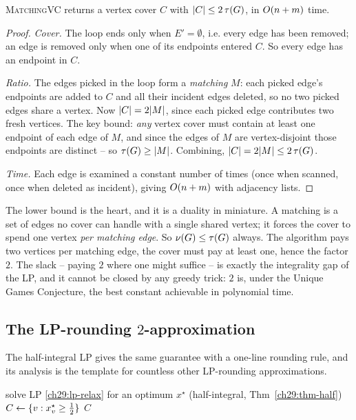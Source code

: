 \begin{lemma}
\label{ch29:lem-matchvc}
\textsc{MatchingVC} returns a vertex cover $C$ with $\lvert C\rvert\le 2\,\tau(G)$, in
$O(n+m)$ time.
\end{lemma}

\begin{proof}
\emph{Cover.} The loop ends only when $E'=\emptyset$, i.e. every edge has been
removed; an edge is removed only when one of its endpoints entered $C$. So every
edge has an endpoint in $C$.

\emph{Ratio.} The edges picked in the loop form a \emph{matching} $M$: each
picked edge's endpoints are added to $C$ and all their incident edges deleted, so
no two picked edges share a vertex. Now $\lvert C\rvert=2\lvert M\rvert$, since each picked edge
contributes two fresh vertices. The key bound: \emph{any} vertex cover must
contain at least one endpoint of each edge of $M$, and since the edges of $M$ are
vertex-disjoint those endpoints are distinct -- so $\tau(G)\ge\lvert M\rvert$.
Combining, $\lvert C\rvert=2\lvert M\rvert\le 2\,\tau(G)$.

\emph{Time.} Each edge is examined a constant number of times (once when scanned,
once when deleted as incident), giving $O(n+m)$ with adjacency lists.
\end{proof}

\begin{whybox}
The lower bound is the heart, and it is a duality in miniature. A matching is a
set of edges no cover can handle with a single shared vertex; it forces the cover
to spend one vertex \emph{per matching edge}. So $\nu(G)\le\tau(G)$ always.
The algorithm pays two vertices per matching edge, the cover must pay at least
one, hence the factor $2$. The slack -- paying $2$ where one might suffice -- is
exactly the integrality gap of the LP, and it cannot be closed by any greedy
trick: $2$ is, under the Unique Games Conjecture, the best constant achievable in
polynomial time.
\end{whybox}

\subsection{The LP-rounding $2$-approximation}

The half-integral LP gives the same guarantee with a one-line rounding rule, and
its analysis is the template for countless other LP-rounding approximations.

\begin{algorithm}[H]
\caption{\textsc{RoundLPVC}$(\Gph)$ -- LP rounding}
\label{ch29:alg-lpvc}
\DontPrintSemicolon
solve LP \eqref{ch29:lp-relax} for an optimum $x^\star$ (half-integral, Thm~\ref{ch29:thm-half})\;
$C\leftarrow\{v: x^\star_v\ge \tfrac12\}$\;
\Return $C$\;
\end{algorithm}

